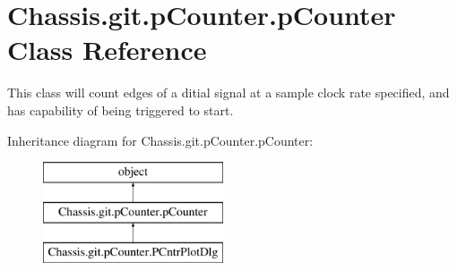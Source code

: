 \hypertarget{class_chassis_8git_1_1p_counter_1_1p_counter}{\section{Chassis.\-git.\-p\-Counter.\-p\-Counter Class Reference}
\label{class_chassis_8git_1_1p_counter_1_1p_counter}
}


This class will count edges of a ditial signal at a sample clock rate specified, and has capability of being triggered to start.  


Inheritance diagram for Chassis.\-git.\-p\-Counter.\-p\-Counter\-:\begin{figure}[H]
\begin{center}
\leavevmode
\includegraphics[height=3.000000cm]{class_chassis_8git_1_1p_counter_1_1p_counter}
\end{center}
\end{figure}
